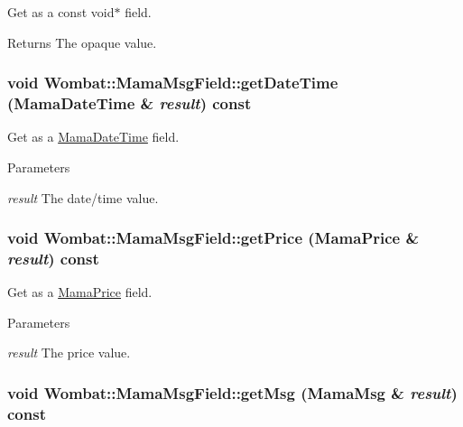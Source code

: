 Get as a const void$\ast$ field. \begin{DoxyReturn}{Returns}
The opaque value. 
\end{DoxyReturn}
\hypertarget{classWombat_1_1MamaMsgField_a2be713355da30ba739b83c391e229323}{
\subsubsection[{getDateTime}]{\setlength{\rightskip}{0pt plus 5cm}void Wombat::MamaMsgField::getDateTime ({\bf MamaDateTime} \& {\em result}) const}}
\label{classWombat_1_1MamaMsgField_a2be713355da30ba739b83c391e229323}


Get as a \hyperlink{classWombat_1_1MamaDateTime}{MamaDateTime} field. 
\begin{DoxyParams}{Parameters}
\item[{\em result}]The date/time value. \end{DoxyParams}
\hypertarget{classWombat_1_1MamaMsgField_ad10995763db86d09ba98e6a6fe17e4aa}{
\subsubsection[{getPrice}]{\setlength{\rightskip}{0pt plus 5cm}void Wombat::MamaMsgField::getPrice ({\bf MamaPrice} \& {\em result}) const}}
\label{classWombat_1_1MamaMsgField_ad10995763db86d09ba98e6a6fe17e4aa}


Get as a \hyperlink{classWombat_1_1MamaPrice}{MamaPrice} field. 
\begin{DoxyParams}{Parameters}
\item[{\em result}]The price value. \end{DoxyParams}
\hypertarget{classWombat_1_1MamaMsgField_ad072efdd93ea32ab5a7f80dda1cfdb8b}{
\subsubsection[{getMsg}]{\setlength{\rightskip}{0pt plus 5cm}void Wombat::MamaMsgField::getMsg ({\bf MamaMsg} \& {\em result}) const}}
\label{classWombat_1_1MamaMsgField_ad072efdd93ea32ab5a7f80dda1cfdb8b}


